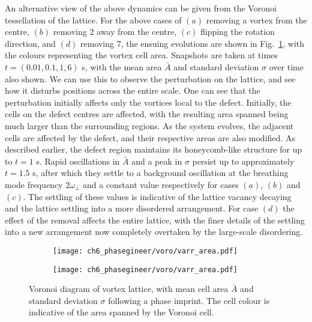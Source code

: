 An alternative view of the above dynamics can be given from the Voronoi tessellation of the lattice. For the above cases of $(a)$ removing a vortex from the centre, $(b)$ removing 2 away from the centre, $(c)$ flipping the rotation direction, and $(d)$ removing 7, the ensuing evolutions are shown in Fig.~\ref{fig:voronoisarea}, with the colours representing the vortex cell area. Snapshots are taken at times $t=(0.01,0.1,1,6)$ s, with the mean area $\bar{A}$ and standard deviation $\sigma$ over time also shown. We can use this to observe the perturbation on the lattice, and see how it disturbs positions across the entire scale. One can see that the perturbation initially affects only the vortices local to the defect. Initially, the cells on the defect centres are affected, with the resulting area spanned being much larger than the surrounding regions. As the system evolves, the adjacent cells are affected by the defect, and their respective areas are also modified. As described earlier, the defect region maintains its honeycomb-like structure for up to $t=1$ s. Rapid oscillations in $\bar{A}$ and a peak in $\sigma$ persist up to approximately $t=1.5$ s, after which they settle to a background oscillation at the breathing mode frequency $2\omega_\perp$ and a constant value respectively for cases $(a)$, $(b)$ and $(c)$. The settling of these values is indicative of the lattice vacancy decaying and the lattice settling into a more disordered arrangement. For case $(d)$ the effect of the removal affects the entire lattice, with the finer details of the settling into a new arrangement now completely overtaken by the large-scale disordering.

\begin{figure}\centering
    \begin{subfigure}{0.6\textwidth}
        \texttt{[image: ch6\_phasegineer/voro/varr\_area.pdf]}
    \end{subfigure}
    \begin{subfigure}{0.6\textwidth}
        \texttt{[image: ch6\_phasegineer/voro/varr\_area.pdf]}
    \end{subfigure}
    \caption{Voronoi diagram of vortex lattice, with mean cell area $\bar{A}$ and standard deviation $\sigma$ following a phase imprint. The cell colour is indicative of the area spanned by the Voronoi cell.}\label{fig:voronoisarea}
\end{figure}

